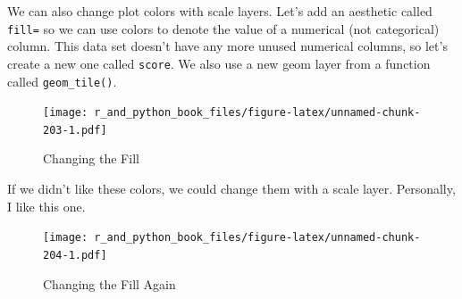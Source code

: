 \documentclass[
  12pt,
  krantz2]{krantz}
\makeatletter
\newenvironment{Shaded}{\begin{snugshade}}{\end{snugshade}}
\newcommand{\AttributeTok}[1]{\textcolor[rgb]{0.61,0.61,0.61}{#1}}
\newcommand{\DecValTok}[1]{\textcolor[rgb]{0.06,0.06,0.06}{#1}}
\newcommand{\FunctionTok}[1]{\textcolor[rgb]{0,0,0}{#1}}
\newcommand{\NormalTok}[1]{#1}
\newcommand{\OtherTok}[1]{\textcolor[rgb]{0.37,0.37,0.37}{#1}}
\newcommand{\SpecialCharTok}[1]{\textcolor[rgb]{0,0,0}{#1}}
\newenvironment{kframe}{%
\medskip{}
\setlength{\fboxsep}{.8em}
 \def\at@end@of@kframe{}%
 \ifinner\ifhmode%
  \def\at@end@of@kframe{\end{minipage}}%
  \begin{minipage}{\columnwidth}%
 \fi\fi%
 \def\FrameCommand##1{\hskip\@totalleftmargin \hskip-\fboxsep
 \colorbox{shadecolor}{##1}\hskip-\fboxsep
     \hskip-\linewidth \hskip-\@totalleftmargin \hskip\columnwidth}%
 \MakeFramed {\advance\hsize-\width
   \@totalleftmargin\z@ \linewidth\hsize
   \@setminipage}}%
 {\par\unskip\endMakeFramed%
 \at@end@of@kframe}
\renewenvironment{Shaded}{\begin{kframe}}{\end{kframe}}
\makeatother
\begin{document}
We can also change plot colors with scale layers. Let's add an aesthetic called \texttt{fill=} so we can use colors to denote the value of a numerical (not categorical) column. This data set doesn't have any more unused numerical columns, so let's create a new one called \texttt{score}. We also use a new geom layer from a function called \texttt{geom\_tile()}.

\begin{Shaded}
\end{Shaded}

\begin{figure}
\centering
\texttt{[image: r\_and\_python\_book\_files/figure-latex/unnamed-chunk-203-1.pdf]}
\caption{\label{fig:unnamed-chunk-203}Changing the Fill}
\end{figure}

If we didn't like these colors, we could change them with a scale layer. Personally, I like this one.

\begin{Shaded}
\end{Shaded}

\begin{figure}
\centering
\texttt{[image: r\_and\_python\_book\_files/figure-latex/unnamed-chunk-204-1.pdf]}
\caption{\label{fig:unnamed-chunk-204}Changing the Fill Again}
\end{figure}
\end{document}
